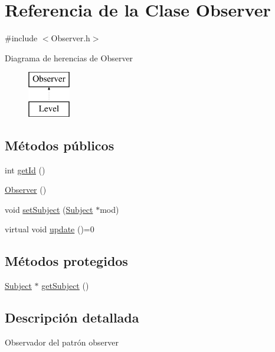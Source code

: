 \hypertarget{classObserver}{}\section{Referencia de la Clase Observer}
\label{classObserver}


{\ttfamily \#include $<$Observer.\+h$>$}

Diagrama de herencias de Observer\begin{figure}[H]
\begin{center}
\leavevmode
\includegraphics[height=2.000000cm]{classObserver}
\end{center}
\end{figure}
\subsection*{Métodos públicos}
\begin{DoxyCompactItemize}
\item 
int \hyperlink{classObserver_a0f330a29d7a3a7444fb79b6e4b59576d}{get\+Id} ()
\item 
\hyperlink{classObserver_a19c43f80a38a332a6f694783df3c9835}{Observer} ()
\item 
void \hyperlink{classObserver_a75bcfba81bc33d0b19ae1b33be1c9313}{set\+Subject} (\hyperlink{classSubject}{Subject} $\ast$mod)
\item 
virtual void \hyperlink{classObserver_ac75e4b339faeb3ea6fe0a01bf0b4a215}{update} ()=0
\end{DoxyCompactItemize}
\subsection*{Métodos protegidos}
\begin{DoxyCompactItemize}
\item 
\hyperlink{classSubject}{Subject} $\ast$ \hyperlink{classObserver_aa9de5b8862df591c9f63eb311ce1b70a}{get\+Subject} ()
\end{DoxyCompactItemize}


\subsection{Descripción detallada}
Observador del patrón observer 

